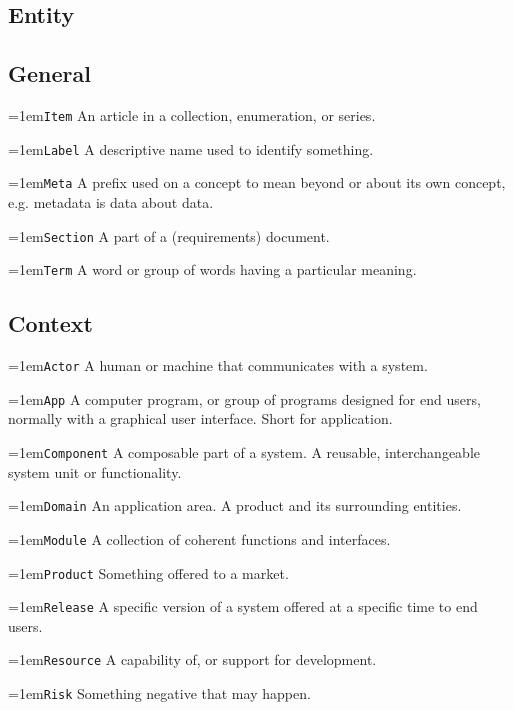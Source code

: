 \documentclass[9pt,a4paper,oneside]{report}
\begin{document}
\begin{multicols*}{4}
    \section*{Entity}

\subsection*{General}

\hangindent=1em\lstinline+Item+  An article in a collection, enumeration, or series.

\hangindent=1em\lstinline+Label+ A descriptive name used to identify something.

\hangindent=1em\lstinline+Meta+ A prefix used on a concept to mean beyond or about its own concept, e.g. metadata is data about data.

\hangindent=1em\lstinline+Section+ A part of a (requirements) document.

\hangindent=1em\lstinline+Term+ A word or group of words having a particular meaning.

\subsection*{Context}

\hangindent=1em\lstinline+Actor+ A human or machine that communicates with a system.

\hangindent=1em\lstinline+App+ A computer program, or group of programs designed for end users, normally with a graphical user interface. Short for application.

\hangindent=1em\lstinline+Component+ A composable part of a system. A reusable, interchangeable system unit or functionality.

\hangindent=1em\lstinline+Domain+ An application area. A product and its surrounding entities.

\hangindent=1em\lstinline+Module+ A collection of coherent functions and interfaces.

\hangindent=1em\lstinline+Product+ Something offered to a market.

\hangindent=1em\lstinline+Release+ A specific version of a system offered at a specific time to end users.

\hangindent=1em\lstinline+Resource+ A capability of, or support for development.

\hangindent=1em\lstinline+Risk+ Something negative that may happen.


\end{multicols*}
\end{document}
